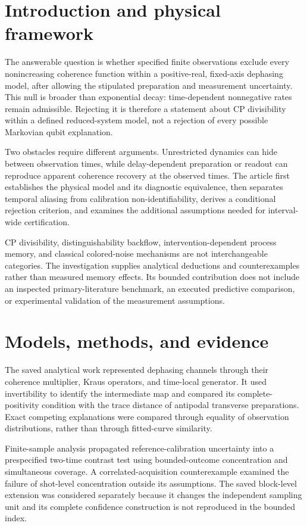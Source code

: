 \documentclass[11pt]{article}
\begin{document}
\section{Introduction and physical framework}
The answerable question is whether specified finite observations exclude every nonincreasing coherence function within a positive-real, fixed-axis dephasing model, after allowing the stipulated preparation and measurement uncertainty. This null is broader than exponential decay: time-dependent nonnegative rates remain admissible. Rejecting it is therefore a statement about CP divisibility within a defined reduced-system model, not a rejection of every possible Markovian qubit explanation.

Two obstacles require different arguments. Unrestricted dynamics can hide between observation times, while delay-dependent preparation or readout can reproduce apparent coherence recovery at the observed times. The article first establishes the physical model and its diagnostic equivalence, then separates temporal aliasing from calibration non-identifiability, derives a conditional rejection criterion, and examines the additional assumptions needed for interval-wide certification.

CP divisibility, distinguishability backflow, intervention-dependent process memory, and classical colored-noise mechanisms are not interchangeable categories. The investigation supplies analytical deductions and counterexamples rather than measured memory effects. Its bounded contribution does not include an inspected primary-literature benchmark, an executed predictive comparison, or experimental validation of the measurement assumptions.

\section{Models, methods, and evidence}
The saved analytical work represented dephasing channels through their coherence multiplier, Kraus operators, and time-local generator. It used invertibility to identify the intermediate map and compared its complete-positivity condition with the trace distance of antipodal transverse preparations. Exact competing explanations were compared through equality of observation distributions, rather than through fitted-curve similarity.

Finite-sample analysis propagated reference-calibration uncertainty into a prespecified two-time contrast test using bounded-outcome concentration and simultaneous coverage. A correlated-acquisition counterexample examined the failure of shot-level concentration outside its assumptions. The saved block-level extension was considered separately because it changes the independent sampling unit and its complete confidence construction is not reproduced in the bounded index.
\end{document}
